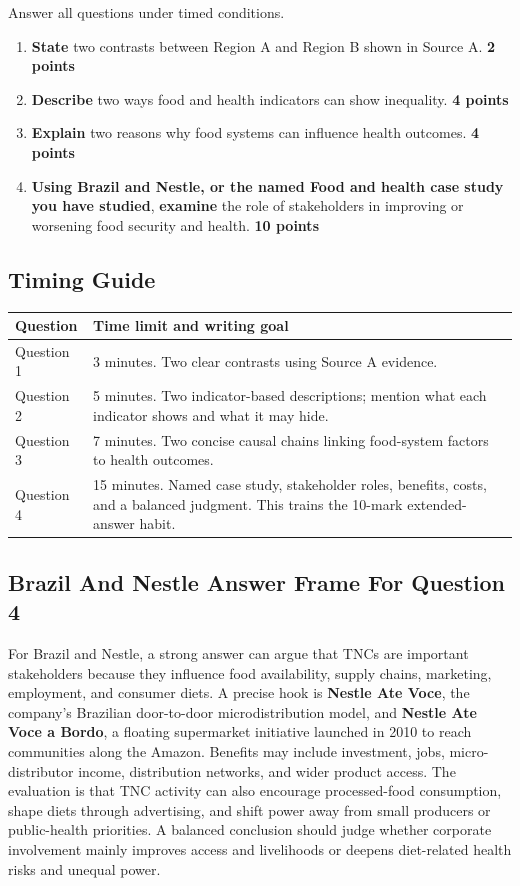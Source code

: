 \documentclass[11pt,a4paper]{article}
\newcommand{\term}[1]{\textcolor{HeadingBlue}{\textbf{#1}}}
\newcommand{\exam}[1]{\textcolor{AccentTeal}{\textbf{#1}}}
\begin{document}
Answer all questions under timed conditions.

\begin{enumerate}
  \item \exam{State} two contrasts between Region A and Region B shown in
  Source A. \hfill \textbf{2 points}
  \item \exam{Describe} two ways food and health indicators can show inequality.
  \hfill \textbf{4 points}
  \item \exam{Explain} two reasons why food systems can influence health
  outcomes. \hfill \textbf{4 points}
  \item \exam{Using Brazil and Nestle, or the named Food and health case study
  you have studied}, \exam{examine} the role of stakeholders in improving or
  worsening food security and health. \hfill \textbf{10 points}
\end{enumerate}

\subsection{Timing Guide}

\begin{tabularx}{\textwidth}{L{0.2\textwidth}Y}
\toprule
\textbf{Question} & \textbf{Time limit and writing goal} \\
\midrule
Question 1 & 3 minutes. Two clear contrasts using Source A evidence. \\
Question 2 & 5 minutes. Two indicator-based descriptions; mention what each
indicator shows and what it may hide. \\
Question 3 & 7 minutes. Two concise causal chains linking food-system factors
to health outcomes. \\
Question 4 & 15 minutes. Named case study, stakeholder roles, benefits, costs,
and a balanced judgment. This trains the 10-mark extended-answer habit. \\
\bottomrule
\end{tabularx}

\subsection{Brazil And Nestle Answer Frame For Question 4}

For Brazil and Nestle, a strong answer can argue that TNCs are important
stakeholders because they influence food availability, supply chains, marketing,
employment, and consumer diets. A precise hook is \term{Nestle Ate Voce}, the
company's Brazilian door-to-door microdistribution model, and \term{Nestle Ate
Voce a Bordo}, a floating supermarket initiative launched in 2010 to reach
communities along the Amazon. Benefits may include investment, jobs,
micro-distributor income, distribution networks, and wider product access. The
evaluation is that TNC activity can also encourage processed-food consumption,
shape diets through advertising, and shift power away from small producers or
public-health priorities. A balanced conclusion should judge whether corporate
involvement mainly improves access and livelihoods or deepens diet-related
health risks and unequal power.
\end{document}
